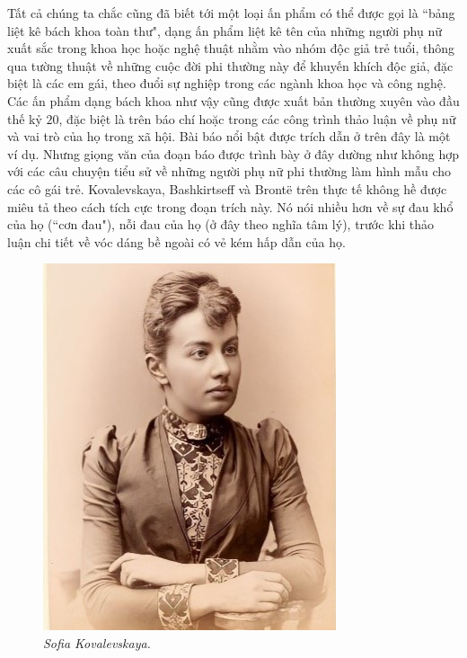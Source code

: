 \begin{multicols}{2}
	Tất cả chúng ta chắc cũng đã biết tới một loại ấn phẩm có thể được gọi là ``bảng liệt kê bách khoa toàn thư", dạng ấn phẩm liệt kê tên của những người phụ nữ xuất sắc trong khoa học hoặc nghệ thuật  nhằm vào nhóm độc giả trẻ tuổi, thông qua tường thuật về những cuộc đời phi thường này để khuyến khích độc giả, đặc biệt là các em gái, theo đuổi sự nghiệp trong các ngành khoa học và công nghệ. Các ấn phẩm dạng bách khoa như vậy cũng được xuất bản thường xuyên vào đầu thế kỷ $20$, đặc biệt là trên báo chí hoặc trong các công trình thảo luận về phụ nữ và vai trò của họ trong xã hội. Bài báo nổi bật được trích dẫn ở trên đây là một ví dụ. Nhưng giọng văn của đoạn báo được trình bày ở đây dường như không hợp với các câu chuyện tiểu sử về những người phụ nữ phi thường làm hình mẫu cho các cô gái trẻ. Kovalevskaya, Bashkirtseff và Brontë trên thực tế không hề được miêu tả theo cách tích cực trong đoạn trích này. Nó nói nhiều hơn về sự đau khổ của họ (``cơn đau"), nỗi đau của họ (ở đây theo nghĩa tâm lý), trước khi thảo luận chi tiết về vóc dáng bề ngoài có vẻ kém hấp dẫn của họ.
	\begin{figure}[H]
		\vspace*{-5pt}
		\centering
		\captionsetup{labelformat= empty, justification=centering}
		\includegraphics[width= 0.75\linewidth]{4}
		\caption{\small\textit{\color{lichsutoanhoc}Sofia Kovalevskaya.}}
		\vspace*{-10pt}
	\end{figure}

\end{multicols}
